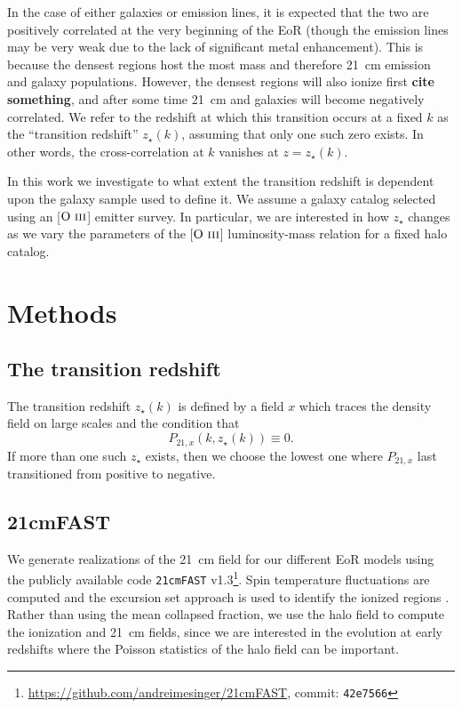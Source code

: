 \documentclass[a4paper,fleqn,usenatbib]{mnras}
\newcommand{\beq}{\begin{equation}}
\newcommand{\eeq}{\end{equation}}
\newcommand{\tfast}{\texttt{21cmFAST}}
\newcommand{\OIII}{\ensuremath{\text{O~\textsc{iii}}}}
\newcommand{\zst}{\ensuremath{z_{\star}}}
\begin{document}
In the case of either galaxies or emission lines, it is expected that the two
are positively correlated at the very beginning of the EoR (though the
emission lines may be very weak due to the lack of significant metal
enhancement). This is because the densest regions host the most mass and
therefore 21~cm emission and galaxy populations. However, the densest regions
will also ionize first {\bf cite something}, and after some time 21~cm and
galaxies will become negatively correlated. We refer to the redshift at which
this transition occurs at a fixed $k$ as the ``transition redshift''
$z_\star(k)$, assuming that only one such zero exists. In other words, the
cross-correlation at $k$ vanishes at $z=z_{\star}(k)$.

In this work we investigate to what extent the transition redshift is
dependent upon the galaxy sample used to define it. We assume a galaxy catalog
selected using an [\OIII] emitter survey. In particular, we are interested in
how $z_\star$ changes as we vary the parameters of the [\OIII] luminosity-mass
relation for a fixed halo catalog.

\section{Methods} \label{sec:methods}
\subsection{The transition redshift} \label{ssec:ztran_def}
The transition redshift $\zst(k)$ is defined by a field $x$ which traces the
density field on large scales and the condition that
\beq \label{eq:ztran_def}
P_{21,x}(k, \zst(k)) \equiv 0\text{.}
\eeq
If more than one such \zst{} exists, then we choose the lowest one where
$P_{21,x}$ last transitioned from positive to negative.

\subsection{21cmFAST} \label{ssec:tfast}
We generate realizations of the 21~cm field for our different EoR models using
the publicly available code \tfast{}
v1.3\footnote{\url{https://github.com/andreimesinger/21cmFAST}, commit:
\texttt{42e7566}}. Spin temperature fluctuations are computed and the
excursion set approach is used to identify the ionized regions
\citep{2011MNRAS.411..955M}. Rather than using the mean collapsed fraction, we
use the halo field to compute the ionization and 21~cm fields, since we are
interested in the evolution at early redshifts where the Poisson statistics of
the halo field can be important.
\end{document}

